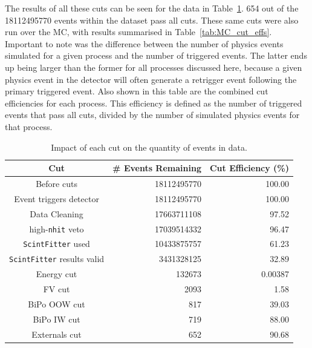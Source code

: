 The results of all these cuts can be seen for the data in Table~\ref{tab:data_cut_effs}. 654 out of the \num{18112495770} events within the dataset pass all cuts. These same cuts were also run over the MC, with results summarised in Table~\ref{tab:MC_cut_effs}. Important to note was the difference between the number of physics events simulated for a given process and the number of triggered events. The latter ends up being larger than the former for all processes discussed here, because a given physics event in the detector will often generate a retrigger event following the primary triggered event. Also shown in this table are the combined cut efficiencies for each process. This efficiency is defined as the number of triggered events that pass all cuts, divided by the number of simulated physics events for that process.

\begin{table}
    \centering
    \begin{tabular}{c r r}
        \hline
        Cut                         & \# Events Remaining & Cut Efficiency (\%) \\ \hline \hline
        Before cuts                 & \num{18112495770} & 100.00   \\
        Event triggers detector     & \num{18112495770} & 100.00   \\
        Data Cleaning               & \num{17663711108} & 97.52    \\
        high-\texttt{nhit} veto     & \num{17039514332} & 96.47    \\
        \texttt{ScintFitter} used   & \num{10433875757} & 61.23    \\
        \texttt{ScintFitter} results valid & \num{3431328125} & 32.89 \\
        Energy cut                  & \num{132673}      & 0.00387 \\
        FV cut                      & \num{2093}        & 1.58    \\
        BiPo OOW cut                & \num{817}         & 39.03   \\
        BiPo IW cut                 & \num{719}         & 88.00   \\
        Externals cut               & \num{652}         & 90.68   \\
        \hline
    \end{tabular}
    \caption{Impact of each cut on the quantity of events in data.}
    \label{tab:data_cut_effs}
\end{table}


